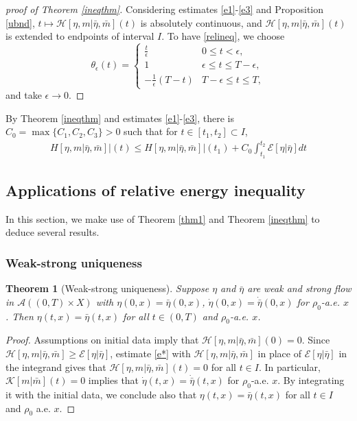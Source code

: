 \documentclass[10pt, letterpaper]{article}
\def\E{{\mathcal{E}}}
\def\H{{\mathcal{H}}}
\def\K{{\mathcal{K}}}
\newtheorem{theorem}{Theorem}
\theoremstyle{definition}
\theoremstyle{remark}
\begin{document}
\begin{proof}[proof of Theorem \ref{ineqthm}]
Considering estimates \eqref{e1}-\eqref{e3} and Proposition \ref{ubnd}, $t \mapsto \H[\eta,m|\bar\eta,\bar{m}](t)$ is absolutely continuous, and $\H[\eta,m|\bar\eta,\bar{m}](t)$ is extended to endpoints of interval $I$. To have \eqref{relineq}, we choose 
\begin{equation} \label{theta}
    \theta_\epsilon(t) = 
    \begin{cases}
        \frac{t}{\epsilon} & 0 \leq t < \epsilon, \\
        1 & \epsilon \le t \le T-\epsilon,\\
        -\frac{1}{\epsilon}(T-t) & T-\epsilon \le t \le T,
    \end{cases}
\end{equation}
and take $\epsilon \rightarrow 0$.
\end{proof}

By Theorem \ref{ineqthm} and estimates \eqref{e1}-\eqref{e3}, there is $C_0 = \max\{C_1,C_2,C_3\}>0$ such that for $t \in [t_1, t_2] \subset I$,
    \begin{equation} \label{e*}
        \begin{aligned}
            \left.H[\eta, {m} | \bar{\eta}, \bar{{m}}]\right|(t) \leq \left.H[\eta, {m} | \bar{\eta}, \bar{{m}}]\right|(t_1) + C_0\int_{t_1}^{t_2} \mathcal{E}[\eta | \bar{\eta}]dt
        \end{aligned}
    \end{equation}

   
\subsection{Applications of relative energy inequality}
In this section, we make use of Theorem \ref{thm1} and Theorem \ref{ineqthm} to deduce several results.
\subsubsection{Weak-strong uniqueness}


\begin{theorem}[Weak-strong uniqueness]
    Suppose $\eta$ and $\bar\eta$ are weak and strong flow in $\mathcal{A}((0,T)\times X)$ with
    $\eta(0,x) = \bar\eta(0,x)$, $\dot{\eta}(0,x) = \dot{\bar\eta}(0,x)$ for $\rho_0$-a.e. $x$. Then $\eta(t,x) = \bar\eta(t,x)$ for all $t\in(0,T)$ and $\rho_0$-a.e. $x$. 
\end{theorem}
\begin{proof}
 Assumptions on initial data imply that $\H[\eta,m | \bar\eta,\bar{m}](0)=0$. Since $\H[\eta,m|\bar\eta,\bar{m}]\ge \E[\eta|\bar\eta]$, estimate \eqref{e*} with $\H[\eta,m|\bar\eta,\bar{m}]$ in place of $\E[\eta|\bar\eta]$ in the integrand gives that $\H[\eta,m|\bar\eta,\bar{m}](t)=0$ for all $t \in I$. In particular, $\K[m|\bar{m}](t)=0$ implies that $\dot\eta(t,x) = \dot{\bar\eta}(t,x)$ for $\rho_0$-a.e. $x$. By integrating it with the initial data, we conclude also that $\eta(t,x) = \bar\eta(t,x)$ for all $t\in I$ and $\rho_0$ a.e. $x$.
\end{proof}
\end{document}

